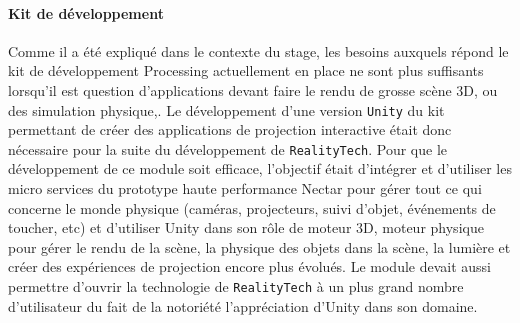 \paragraph{Kit de développement} Comme il a été expliqué dans le contexte du stage, les besoins auxquels répond le kit de développement Processing actuellement en place ne sont plus suffisants lorsqu'il est question d'applications devant faire le rendu de grosse scène 3D, ou des simulation physique,. Le développement d'une version \texttt{Unity} du kit permettant de créer des applications de projection interactive était donc nécessaire pour la suite du développement de \texttt{RealityTech}. Pour que le développement de ce module soit efficace, l'objectif était d'intégrer et d'utiliser les micro services du prototype haute performance Nectar pour gérer tout ce qui concerne le monde physique (caméras, projecteurs, suivi d'objet, événements de toucher, etc) et d'utiliser Unity dans son rôle de moteur 3D, moteur physique pour gérer le rendu de la scène, la physique des objets dans la scène, la lumière et créer des expériences de projection encore plus évolués. Le module devait aussi permettre d'ouvrir la technologie de \texttt{RealityTech} à un plus grand nombre d'utilisateur du fait de la notoriété l'appréciation d'Unity dans son domaine. 